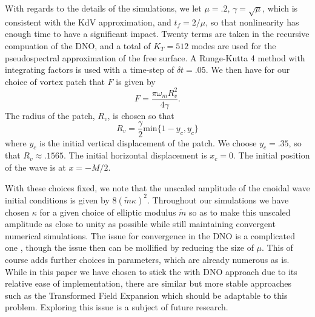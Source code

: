 \documentclass[a4paper,11pt]{article}
\begin{document}
With regards to the details of the simulations, we let $\mu=.2$, $\gamma = \sqrt{\mu}$, which is consistent with the KdV approximation, and $t_{f}=2/\mu$, so that nonlinearity has enough time to have a significant impact.  Twenty terms are taken in the recursive compuation of the DNO, and a total of $K_{T}=512$ modes are used for the pseudospectral approximation of the free surface.  A Runge-Kutta 4 method with integrating factors is used with a time-step of $\delta t = .05$.   We then have for our choice of vortex patch that $F$ is given by 
\[
F = \frac{\pi \omega_{m}R_{v}^{2}}{4\gamma}.
\]
The radius of the patch, $R_{v}$, is chosen so that
\[
R_{v} = \frac{\gamma}{2}\mbox{min}\{1-y_{c},y_{c}\}
\]
where $y_{c}$ is the initial vertical displacement of the patch.  We choose $y_{c}=.35$, so that $R_{v}\approx.1565$.  The initial horizontal displacement is $x_{c}=0$.  The initial position of the wave is at $x=-M/2$.  

With these choices fixed, we note that the unscaled amplitude of the cnoidal wave initial conditions is given by $8(\tilde{m}\kappa)^{2}$.  Throughout our simulations we have chosen $\kappa$ for a given choice of elliptic modulus $\tilde{m}$ so as to make this unscaled amplitude as close to unity as possible while still maintaining convergent numerical simulations.  The issue for convergence in the DNO is a complicated one \cite{guyenne,wilkening}, though the issue then can be mollified by reducing the size of $\mu$.  This of course adds further choices in parameters, which are already numerous as is.  While in this paper we have chosen to stick the with DNO approach due to its relative ease of implementation, there are similar but more stable approaches such as the Transformed Field Expansion \cite{nicholls} which should be adaptable to this problem.  Exploring this issue is a subject of future research.   
\end{document}
